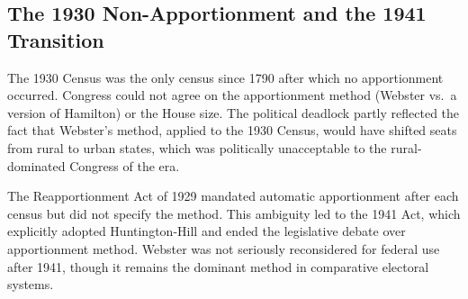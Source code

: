 \subsection{The 1930 Non-Apportionment and the 1941 Transition}

The 1930 Census was the only census since 1790 after which no
apportionment occurred.
Congress could not agree on the apportionment method (Webster vs.\
a version of Hamilton) or the House size.
The political deadlock partly reflected the fact that Webster's method,
applied to the 1930 Census, would have shifted seats from rural to
urban states, which was politically unacceptable to the rural-dominated
Congress of the era.

The Reapportionment Act of 1929 \citep{apportionment1929} mandated
automatic apportionment after each census but did not specify the method.
This ambiguity led to the 1941 Act, which explicitly adopted
Huntington-Hill and ended the legislative debate over apportionment method.
Webster was not seriously reconsidered for federal use after 1941,
though it remains the dominant method in comparative electoral systems.
